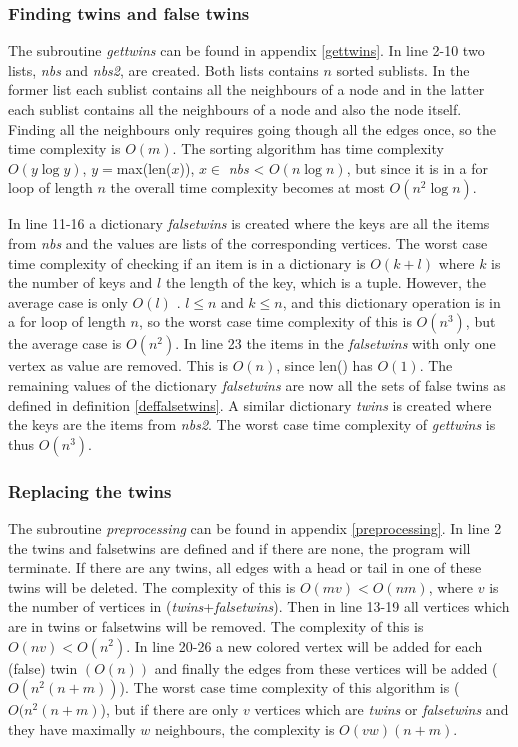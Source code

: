 \documentclass[twoside]{article}
\theoremstyle{definition}
\theoremstyle{plain}
\begin{document}
\begin{multicols}{2}
\subsubsection{Finding twins and false twins}
The subroutine \emph{gettwins} can be found in appendix \ref{gettwins}. In line 2-10 two lists, \emph{nbs} and \emph{nbs2}, are created. Both lists contains $n$ sorted sublists. In the former list each sublist contains all the neighbours of a node and in the latter each sublist contains all the neighbours of a node and also the node itself. Finding all the neighbours only requires going though all the edges once, so the time complexity is $O(m)$. The sorting algorithm has time complexity $O(y \log y)$, $y=$max(len($x$)), $x \in $ \emph{nbs} < $O(n \log n)$, but since it is in a for loop of length $n$ the overall time complexity becomes at most $O(n^2 \log n)$. 

In line 11-16 a dictionary \emph{falsetwins} is created where the keys are all the items from \emph{nbs} and the values are lists of the corresponding vertices. The worst case time complexity of checking if an item is in a dictionary is $O(k+l)$ where $k$ is the number of keys and $l$ the length of the key, which is a tuple. However, the average case is only $O(l)$ \cite{website:pythonTimeComplexity}.  $l\leq n$ and $k\leq n$, and this dictionary operation is in a for loop of length $n$, so the worst case time complexity of this is $O(n^3)$, but the average case is $O(n^2)$. In line 23 the items in the \emph{falsetwins} with only one vertex as value are removed. This is $O(n)$, since len() has $O(1)$.\cite{website:pythonTimeComplexity} The remaining values of the dictionary \emph{falsetwins} are now all the sets of false twins as defined in definition \ref{deffalsetwins}. A similar dictionary \emph{twins} is created where the keys are the items from \emph{nbs2}. The worst case time complexity of \textit{gettwins} is thus $O(n^3)$.


\subsubsection{Replacing the twins}
The subroutine \emph{preprocessing} can be found in appendix \ref{preprocessing}. In line 2 the twins and falsetwins are defined and if there are none, the program will terminate. If there are any twins, all edges with a head or tail in one of these twins will be deleted. The complexity of this is $O(mv) < O (nm)$, where $v$ is the number of vertices in (\emph{twins}+\emph{falsetwins}). Then in line 13-19 all vertices which are in twins or falsetwins will be removed. The complexity of this is $O(nv) < O(n^2)$. In line 20-26 a new colored vertex will be added for each (false) twin $(O(n))$ and finally the edges from these vertices will be added ($O(n^2 (n+m))$). The worst case time complexity of this algorithm is ($O(n^2 (n+m)$), but if there are only $v$ vertices which are \emph{twins} or \emph{falsetwins} and they have maximally $w$ neighbours, the complexity is $O(vw) (n+m)$.


\end{multicols}
\end{document}
